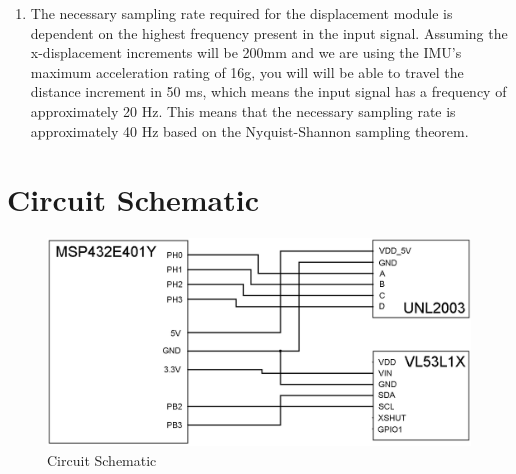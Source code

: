 \documentclass[12pt]{article}
\begin{document}
\begin{enumerate}[label=(\arabic*)]
    \item %
    The necessary sampling rate required for the displacement module is dependent on the highest frequency present in the input signal. Assuming the x-displacement increments will be 200mm and we are using the IMU's maximum acceleration rating of 16g, you will will be able to travel the distance increment in 50 ms, which means the input signal has a frequency of approximately 20 Hz. This means that the necessary sampling rate is approximately 40 Hz based on the Nyquist-Shannon sampling theorem.

\end{enumerate}
\newpage
\section*{Circuit Schematic}
\begin{figure}[h!]
    \centering
    \includegraphics[width=\textwidth]{CircuitSchematic.png}
    \caption{Circuit Schematic}
    \label{fig:CircuitSchematic}
\end{figure}
\newpage
\end{document}
